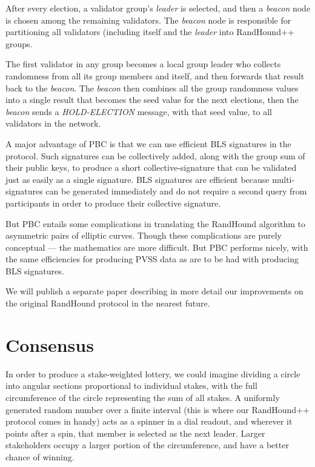 \documentclass[a4paper, 10pt, conference]{ieeeconf}
\begin{document}
After every election, a validator group's \textit{leader} is selected, and then a \textit{beacon} node is chosen among the remaining validators. The \textit{beacon} node is responsible for partitioning all validators (including itself and the \textit{leader} into RandHound++ groups. 

The first validator in any group becomes a local group leader who collects randomness from all its group members and itself, and then forwards that result back to the \textit{beacon}. The \textit{beacon} then combines all the group randomness values into a single result that becomes the seed value for the next elections, then the \textit{beacon} sends a \textit{HOLD-ELECTION} message, with that seed value, to all validators in the network.

A major advantage of PBC is that we can use efficient BLS signatures\cite{c16} in the protocol. Such signatures can be collectively added, along with the group sum of their public keys, to produce a short collective-signature that can be validated just as easily as a single signature. BLS signatures are efficient because multi-signatures can be generated immediately and do not require a second query from participants in order to produce their collective signature.

But PBC entails some complications in translating the RandHound algorithm to asymmetric pairs of elliptic curves. Though these complications are purely conceptual --- the mathematics are more difficult. But PBC performs nicely, with the same efficiencies for producing PVSS data as are to be had with producing BLS signatures.

We will publish a separate paper describing in more detail our improvements on the original RandHound protocol in the nearest future.

\section{Consensus}\label{ConsensusAppendix}
In order to produce a stake-weighted lottery, we could imagine dividing a circle into angular sections proportional to individual stakes, with the full circumference of the circle representing the sum of all stakes. A uniformly generated random number over a finite interval (this is where our RandHound++ protocol comes in handy) acts as a spinner in a dial readout, and wherever it points after a spin, that member is selected as the next leader. Larger stakeholders occupy a larger portion of the circumference, and have a better chance of winning.
\end{document}
